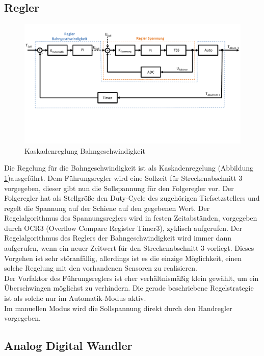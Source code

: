 \documentclass[a4paper, 11pt]{report}
\begin{document}
	\subsection{Regler}
		\begin{figure}[ht]
			\centering
			\includegraphics[width=\textwidth]{rec/Regler.pdf}
			\caption{Kaskadenreglung Bahngeschwindigkeit}
			\label{img:Regelung}
		\end{figure}
		Die Regelung für die Bahngeschwindigkeit ist als Kaskadenregelung (Abbildung \ref{img:Regelung})ausgeführt.
		Dem Führungsregler wird eine Sollzeit für Streckenabschnitt 3 vorgegeben, dieser gibt nun die Sollspannung für den Folgeregler vor.
		Der Folgeregler hat als Stellgröße den Duty-Cycle des zugehörigen Tiefsetzstellers und regelt die Spannung auf der Schiene auf den gegebenen Wert.
		Der Regelalgorithmus des Spannungsreglers wird in festen Zeitabständen, vorgegeben durch OCR3 (Overflow Compare Register Timer3), zyklisch aufgerufen.
		Der Regelalgorithmus des Reglers der Bahngeschwindigkeit wird immer dann aufgerufen, wenn ein neuer Zeitwert für den Streckenabschnitt 3 vorliegt.
		Dieses Vorgehen ist sehr störanfällig, allerdings ist es die einzige Möglichkeit, einen solche Regelung mit den vorhandenen Sensoren zu realisieren. \\
		Der Vorfaktor des Führungsreglers ist eher verhältnismäßig klein gewählt, um ein Überschwingen möglichst zu verhindern.
		Die gerade beschriebene Regelstrategie ist als solche nur im Automatik-Modus aktiv.\\
		Im manuellen Modus wird die Sollspannung direkt durch den Handregler vorgegeben.
		\newpage
	\subsection{Analog Digital Wandler}
\end{document}
